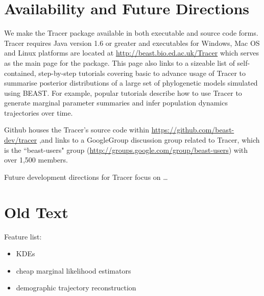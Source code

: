 \documentclass{bioinfo}
\begin{document}
\section*{Availability and Future Directions}

We make the Tracer package available in both executable and source code forms.  Tracer requires Java version 1.6 or greater and executables for Windows, Mac OS and Linux platforms are located at \url{http://beast.bio.ed.ac.uk/Tracer} %
which serves as the main page for the package. This page also links to a sizeable list of self-contained, step-by-step tutorials covering basic to advance usage of Tracer to summarise posterior distributions of a large set of phylogenetic models simulated using BEAST.  For example, popular tutorials describe how to use Tracer to generate marginal parameter summaries and infer population dynamics trajectories over time.

Github houses the Tracer's source code within \url{https://github.com/beast-dev/tracer} ,and links to a GoogleGroup discussion group related to Tracer,  
which is the ``beast-users" group (\url{http://groups.google.com/group/beast-users}) with over 1,500 members. 

Future development directions for Tracer focus on \ldots



\section*{Old Text}



Feature list:
\begin{itemize}
\item KDEs
\item cheap marginal likelihood estimators
\item demographic trajectory reconstruction
\end{itemize}
\end{document}

